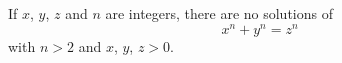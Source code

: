 If $x$, $y$, $z$ and $n$ are integers, there are no solutions of
 $$x^{n} + y^{n} = z^{n}$$
with $n > 2$ and $x$, $y$, $z > 0$.
